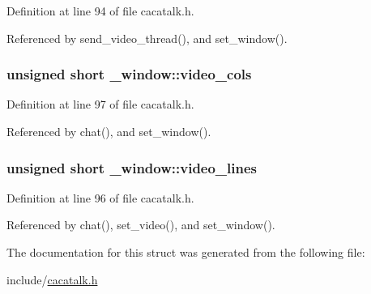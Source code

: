 \-Definition at line 94 of file cacatalk.\-h.



\-Referenced by send\-\_\-video\-\_\-thread(), and set\-\_\-window().

\hypertarget{struct__window_a801a0717b1dd18a92878ab36a4176b42}{
\subsubsection[{video\-\_\-cols}]{\setlength{\rightskip}{0pt plus 5cm}unsigned short {\bf \-\_\-window\-::video\-\_\-cols}}}\label{struct__window_a801a0717b1dd18a92878ab36a4176b42}


\-Definition at line 97 of file cacatalk.\-h.



\-Referenced by chat(), and set\-\_\-window().

\hypertarget{struct__window_a9bd45de653040c0b3b9c725df5f88b2d}{
\subsubsection[{video\-\_\-lines}]{\setlength{\rightskip}{0pt plus 5cm}unsigned short {\bf \-\_\-window\-::video\-\_\-lines}}}\label{struct__window_a9bd45de653040c0b3b9c725df5f88b2d}


\-Definition at line 96 of file cacatalk.\-h.



\-Referenced by chat(), set\-\_\-video(), and set\-\_\-window().



\-The documentation for this struct was generated from the following file\-:\begin{DoxyCompactItemize}
\item 
include/\hyperlink{cacatalk_8h}{cacatalk.\-h}\end{DoxyCompactItemize}
